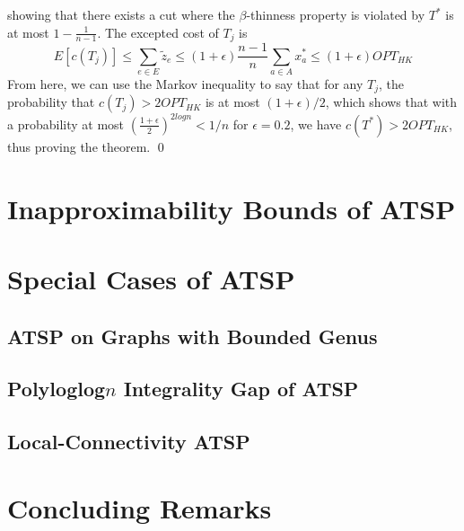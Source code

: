 \documentclass[oneside]{projectpaper} %
\begin{document}
showing that there exists a cut where the $\beta$-thinness property is violated by $T^*$ is at most $1 - \frac{1}{n - 1}$. The excepted cost of $T_j$ is
\begin{equation*}
E[c(T_j)] \leq \sum\limits_{e \in E}\tilde{z}_e \leq (1 + \epsilon)\frac{n - 1}{n}\sum\limits_{a \in A}x_{a}^{*} \leq (1 + \epsilon)OPT_{HK}
\end{equation*}
From here, we can use the Markov inequality to say that for any $T_j$, the probability that $c(T_j) > 2OPT_{HK}$ is at most $(1 + \epsilon)/2$, which shows that with a probability at most $(\frac{1+\epsilon}{2})^{2logn} < 1/n$ for $\epsilon = 0.2$, we have $c(T^*) > 2OPT_{HK}$, thus proving the theorem. \hfill\qed
\newline
\newline  
\section{Inapproximability Bounds of ATSP}

\section{Special Cases of ATSP}

\subsection{ATSP on Graphs with Bounded Genus}

\subsection{Polyloglog$n$ Integrality Gap of ATSP}

\subsection{Local-Connectivity ATSP}

\section{Concluding Remarks}


\nocite{*}


\end{document}

